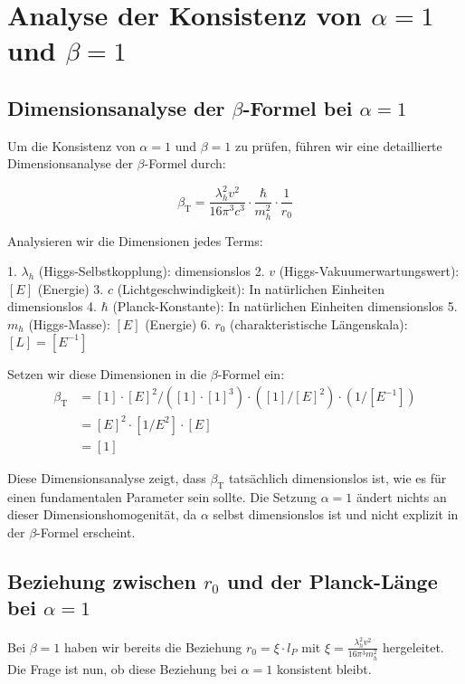 \documentclass[12pt,a4paper]{article}
\newcommand{\betaT}{\beta_{\text{T}}}
\begin{document}
	\section{Analyse der Konsistenz von $\alpha = 1$ und $\beta = 1$}
	
	\subsection{Dimensionsanalyse der $\beta$-Formel bei $\alpha = 1$}
	
	Um die Konsistenz von $\alpha = 1$ und $\beta = 1$ zu prüfen, führen wir eine detaillierte Dimensionsanalyse der $\beta$-Formel durch:
	
	\begin{equation}
		\betaT = \frac{\lambda_h^2 v^2}{16\pi^3 c^3} \cdot \frac{\hbar}{m_h^2} \cdot \frac{1}{r_0}
	\end{equation}
	
	Analysieren wir die Dimensionen jedes Terms:
	
	1. $\lambda_h$ (Higgs-Selbstkopplung): dimensionslos
	2. $v$ (Higgs-Vakuumerwartungswert): $[E]$ (Energie)
	3. $c$ (Lichtgeschwindigkeit): In natürlichen Einheiten dimensionslos
	4. $\hbar$ (Planck-Konstante): In natürlichen Einheiten dimensionslos
	5. $m_h$ (Higgs-Masse): $[E]$ (Energie)
	6. $r_0$ (charakteristische Längenskala): $[L] = [E^{-1}]$
	
	Setzen wir diese Dimensionen in die $\beta$-Formel ein:
	\begin{align}
		\betaT &= [1] \cdot [E]^2 / ([1] \cdot [1]^3) \cdot ([1]/[E]^2) \cdot (1/[E^{-1}]) \\
		&= [E]^2 \cdot [1/E^2] \cdot [E] \\
		&= [1]
	\end{align}
	
	Diese Dimensionsanalyse zeigt, dass $\betaT$ tatsächlich dimensionslos ist, wie es für einen fundamentalen Parameter sein sollte. Die Setzung $\alpha = 1$ ändert nichts an dieser Dimensionshomogenität, da $\alpha$ selbst dimensionslos ist und nicht explizit in der $\beta$-Formel erscheint.
	
	\subsection{Beziehung zwischen $r_0$ und der Planck-Länge bei $\alpha = 1$}
	
	Bei $\beta = 1$ haben wir bereits die Beziehung $r_0 = \xi \cdot l_P$ mit $\xi = \frac{\lambda_h^2 v^2}{16\pi^3 m_h^2}$ hergeleitet. Die Frage ist nun, ob diese Beziehung bei $\alpha = 1$ konsistent bleibt.
	
\end{document}
